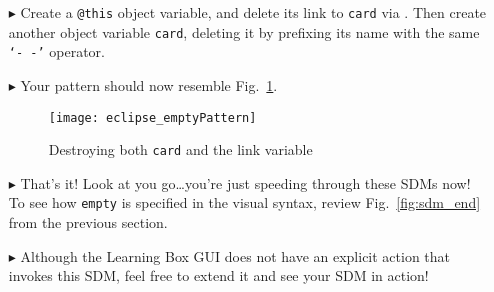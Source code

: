 \begin{itemize}
\item[$\blacktriangleright$] Create a \texttt{@this} object variable, and delete its link to \texttt{card} via . Then create another
object variable \texttt{card}, deleting it by prefixing its name with the same \texttt{`-~-'} operator.

\vspace{0.5cm}

\item[$\blacktriangleright$] Your pattern should now resemble Fig.~\ref{fig:emptyPattern}.

\vspace{0.5cm}

\begin{figure}[htpb]
\begin{center}
  \texttt{[image: eclipse\_emptyPattern]}
  \caption{Destroying both \texttt{card} and the link variable}
  \label{fig:emptyPattern}
\end{center}
\end{figure}

\vspace{0.5cm}

\item[$\blacktriangleright$] That's it! Look at you go\ldots you're just speeding through these SDMs now! To see how \texttt{empty} is specified in the visual
syntax, review Fig.~\ref{fig:sdm_end} from the previous section.

\vspace{0.5cm}

\item[$\blacktriangleright$] Although the Learning Box GUI does not have an explicit action that invokes this SDM, feel free to extend it and see your SDM in
action!

\end{itemize}
